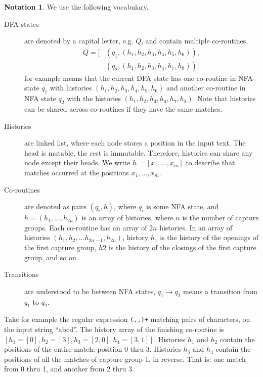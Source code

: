 \documentclass[english,twocolumn]{article}
\theoremstyle{definition}
\newtheorem*{notation}{Notation}
\begin{document}
\begin{notation}

We use the following vocabulary.

\begin{description}
\item[DFA states] are denoted by a capital letter, e.g. $Q$, and
	contain multiple co-routines.  \begin{equation*}\begin{split}Q=[&(q_1, (h_1, h_2, h_3, h_4, h_5, h_6)),\\
	&(q_2, (h_1, h_2, h_3, h_4, h_7, h_8))]\end{split}\end{equation*} for example means
	that the current DFA state has one co-routine in NFA state $q_1$ with
	histories $(h_1, h_2, h_3, h_4, h_5, h_6)$ and another co-routine in NFA state
	$q_2$ with the histories $(h_1, h_2, h_3, h_4, h_7, h_8)$.
	Note that histories can be shared across co-routines if they
	have the same matches.
\item[Histories] are linked list, where each node stores a position in the input text.
	The head is mutable, the rest is immutable. Therefore, histories can share any node
	except their heads. We write $h=[x_1, \dots, x_m]$ to describe that matches occurred
	at the positions $x_1, \dots, x_m$. 
\item[Co-routines] are denoted as pairs $(q_i, h)$, where $q_i$ is some
	NFA state, and $h = (h_1, \dots, h_{2n})$ is an array of histories,
	where $n$ is the number of capture groups.  Each co-routine has an array
	of $2n$ histories. In an array of histories $(h_1, h_2, \dots
	h_{2n-1}, h_{2n})$, history $h_1$ is the history of the openings
	of the first capture group, $h2$ is the history of the closings of
	the first capture group, and so on.
\item[Transitions] are  understood to be between NFA states,
	$q_1\rightarrow q_2$ means a transition from $q_1$ to $q_2$.
\end{description}

Take for example the regular expression \texttt{(..)+} matching
pairs of characters, on the input string ``abcd''. The history array of the
finishing co-routine  is $[h_1=[0], h_2=[3], h_3=[2,0], h_4=[3,1]]$.
Histories $h_1$ and $h_2$ contain the positions of the entire match: position 0 thru 3.
Histories $h_3$ and $h_4$ contain the positions of all the matches of capture group 1, in reverse. That is:
one match from 0 thru 1, and another from 2 thru 3.


\end{notation}
\end{document}
